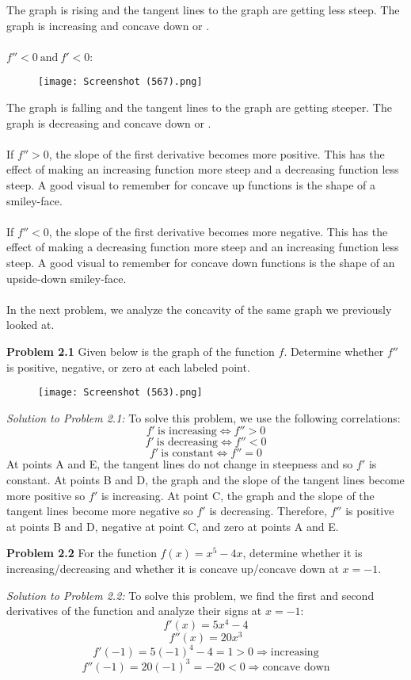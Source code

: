 \documentclass[11pt]{scrartcl}
\begin{document}
\noindent 
The graph is rising and the tangent lines to the graph are getting less steep. The graph is increasing and concave down or . \\
\\
\noindent 
$f''<0 \ \text{and} \ f'<0$: 
\begin{figure}[htp]
    \centering
    \texttt{[image: Screenshot (567).png]}
\end{figure}
\newpage
\noindent 
The graph is falling and the tangent lines to the graph are getting steeper. The graph is decreasing and concave down or . \\
\\
\noindent 
If $f''>0$, the slope of the first derivative becomes more positive. This has the effect of making an increasing function more steep and a decreasing function less steep. A good visual to remember for concave up functions is the shape of a smiley-face. \\
\\
\noindent 
If $f''<0$, the slope of the first derivative becomes more negative. This has the effect of making a decreasing function more steep and an increasing function less steep. A good visual to remember for concave down functions is the shape of an upside-down smiley-face. \\
\\
\noindent 
In the next problem, we analyze the concavity of the same graph we previously looked at. 
\begin{tcolorbox}
[colback=purple!5!white,colframe=purple!75!black]
\textbf{Problem 2.1} Given below is the graph of the function $f$. Determine whether $f''$ is positive, negative, or zero at each labeled point.
\end{tcolorbox}
\begin{figure}[htp]
    \centering
    \texttt{[image: Screenshot (563).png]}
\end{figure}
\noindent 
\textit{Solution to Problem 2.1:} To solve this problem, we use the following correlations: 
$$f' \ \text{is increasing} \Leftrightarrow f''>0$$
$$f' \ \text{is decreasing} \Leftrightarrow f''<0$$
$$f' \ \text{is constant} \Leftrightarrow f''=0$$
\noindent 
At points A and E, the tangent lines do not change in steepness and so $f'$ is constant. At points B and D, the graph  and the slope of the tangent lines become more positive so $f'$ is increasing. At point C, the graph  and the slope of the tangent lines become more negative so $f'$ is decreasing. Therefore, $f''$ is positive at points B and D, negative at point C, and zero at points A and E.  
\begin{tcolorbox}
[colback=purple!5!white,colframe=purple!75!black]
\textbf{Problem 2.2} For the function $f(x)=x^5-4x$, determine whether it is increasing/decreasing and whether it is concave up/concave down at $x=-1$. 
\end{tcolorbox}
\noindent 
\textit{Solution to Problem 2.2:} To solve this problem, we find the first and second derivatives of the function and analyze their signs at $x=-1$:
$$f'(x)=5x^4-4$$
$$f''(x)=20x^3$$
$$f'(-1)=5(-1)^4-4=1>0 \Rightarrow \text{increasing}$$
$$f''(-1)=20(-1)^3=-20<0 \Rightarrow \text{concave down}$$
\end{document}
